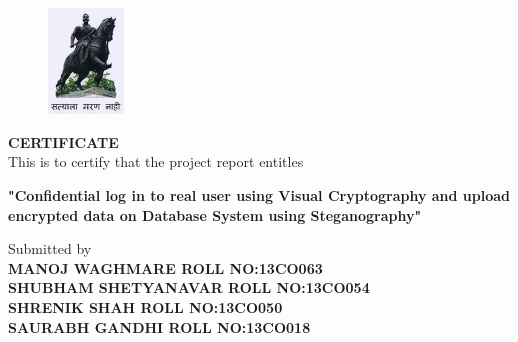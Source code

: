 
%
\noindent
\begin{figure}
  \begin{flushleft}
    \includegraphics[width=2cm]{logo.png}
  \end{flushleft}
  \end{figure}
 
	
%
\begin {center}
{\LARGE\bf CERTIFICATE}\\\vspace{1.4cm}
\large {This is to certify that the project report entitles}\\\vspace{0.7cm}

{\bf "Confidential log in to real user using Visual Cryptography and upload encrypted data on Database System using Steganography"}\\\vspace{0.7cm}

\large {Submitted by}\\\vspace{0.5cm}
{\small\bf{MANOJ WAGHMARE} \hspace{19mm} {\small ROLL NO:13CO063 }\\{SHUBHAM SHETYANAVAR} \hspace{5.5mm} {\small ROLL NO:13CO054 } \\{SHRENIK SHAH} \hspace{29mm} {\small ROLL NO:13CO050} \\{SAURABH GANDHI} \hspace{20.8mm} {\small ROLL NO:13CO018 }\\\vspace{1cm}}
\end{center}
\vspace{3mm} 




